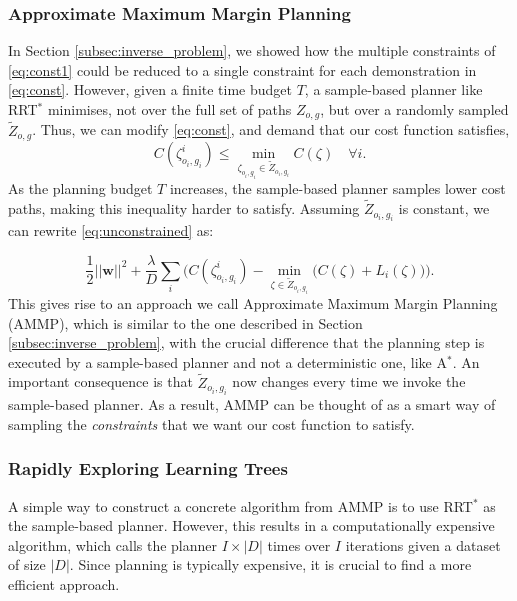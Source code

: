 \documentclass[a4paper,11pt]{report}
\begin{document}
\subsubsection{Approximate Maximum Margin Planning \label{subsec:ammp}}

		In Section \ref{subsec:inverse_problem}, we showed how the multiple constraints of \eqref{eq:const1} could be reduced to a single constraint for each demonstration in \eqref{eq:const}. However, given a finite time budget $T$, a sample-based planner like RRT$^*$ minimises, not over the full set of paths $Z_{o,g}$, but over a randomly sampled $\tilde{Z}_{o,g}$. Thus, we can modify \eqref{eq:const}, and demand that our cost function satisfies,
\begin{equation}
	C(\zeta^i_{o_i,g_i}) \leq \min_{\zeta_{o_i,g_i} \in \tilde{Z}_{o_i,g_i}} C(\zeta) \quad \forall i. \label{eq:const_rrt}
\end{equation}
	As the planning budget $T$ increases, the sample-based planner samples lower cost paths, making this inequality harder to satisfy. Assuming $\tilde{Z}_{o_i,g_i}$ is constant, we can rewrite \eqref{eq:unconstrained} as:

	\begin{equation} \frac{1}{2}||\mathbf{w}||^2 + \frac{\lambda}{D} \sum_i \big( C(\zeta^i_{o_i,g_i}) - \min_{\zeta \in \tilde{Z}_{o_i,g_i}}\big(C(\zeta) + L_i(\zeta)\big) \big). \label{eq:unconstrained_rrt}
	\end{equation}
	This gives rise to an approach we call Approximate Maximum Margin Planning (AMMP), which is similar  to the one described in Section \ref{subsec:inverse_problem}, with the crucial difference that the planning step is executed by a sample-based planner and not a deterministic one, like A$^*$. An important consequence is that $\tilde{Z}_{o_i,g_i}$ now changes every time we invoke the sample-based planner. As a result, AMMP can be thought of as a smart way of sampling the \emph{constraints} that we want our cost function to satisfy. 


\subsubsection{Rapidly Exploring Learning Trees \label{subsec:cached}}

A simple way to construct a concrete algorithm from AMMP is to use RRT$^*$ as the sample-based planner.  However, this results in a computationally expensive algorithm, which calls the planner $I\times|D|$ times over $I$ iterations given a dataset of size $|D|$.  Since planning is typically expensive, it is crucial to find a more efficient approach.
\end{document}
